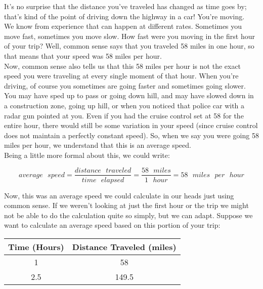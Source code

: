 It’s no surprise that the distance you’ve traveled has changed as time goes by; that’s kind of the point of driving down the highway in a car! You’re moving.\\

We know from experience that  can happen at different rates. Sometimes you move fast, sometimes you move slow. How fast were you moving in the first hour of your trip? Well, common sense says that you traveled 58 miles in one hour, so that means that your speed was 58 miles per hour.\\

Now, common sense also tells us that this 58 miles per hour is not the exact speed you were traveling at every single moment of that hour. When you’re driving, of course you sometimes are going faster and sometimes going slower. You may have sped up to pass or going down hill, and may have slowed down in a construction zone, going up hill, or when you noticed that police car with a radar gun pointed at you. Even if you had the cruise control set at 58 for the entire hour, there
would still be some variation in your speed (since cruise control does not maintain a perfectly constant speed). So, when we say you were going 58 miles per hour, we understand that this is an average speed.\\

Being a little more formal about this, we could write:

\begin{equation*}
	average \text{ } speed = \frac{distance \text{ } traveled}{time \text{ } elapsed} = \frac{58 \text{ } miles}{1 \text{ } hour} = 58 \text{ } miles \text{ } per \text{ } hour
\end{equation*}

Now, this was an average speed we could calculate in our heads just using common sense. If we weren’t looking at just the first hour or the trip we might not be able to do the calculation quite so simply, but we can adapt. Suppose we want to calculate an average speed based on this portion of your trip:

\begin{center}
	\begin{tabular}{|c|c|}
		\hline
		Time (Hours) & Distance Traveled (miles)\\
		\hline
		1 & 58 \\
		\hline
		2.5 & 149.5 \\
		\hline
	\end{tabular}
\end{center}

